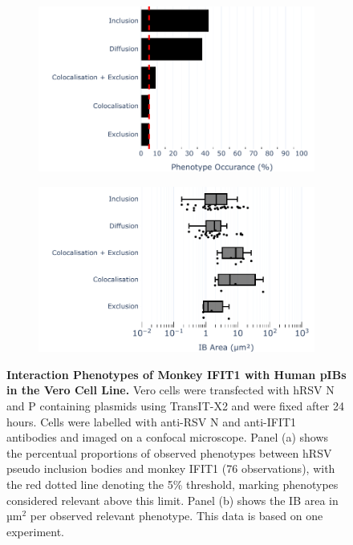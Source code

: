 \begin{figure}
    \begin{subfigure}{0.495\textwidth}
        \caption{}
        \includegraphics[width=1\linewidth]{09. Chapter 4/Figs/01. pIB/02. IFIT1/04. bar_i1_vero_hnhp.pdf} 
    \end{subfigure}
    \begin{subfigure}{0.495\textwidth}
        \caption{}
        \includegraphics[width=1\linewidth]{09. Chapter 4/Figs/01. pIB/02. IFIT1/05. box_i1_vero_hnhp.pdf}
    \end{subfigure}
    \caption[Interaction Phenotypes of Monkey IFIT1 with Human pIBs in the Vero Cell Line.]{\textbf{Interaction Phenotypes of Monkey IFIT1 with Human pIBs in the Vero Cell Line.} Vero cells were transfected with hRSV N and P containing plasmids using TransIT-X2 and were fixed after 24 hours. Cells were labelled with anti-RSV N and anti-IFIT1 antibodies and imaged on a confocal microscope. Panel (a) shows the percentual proportions of observed phenotypes between hRSV pseudo inclusion bodies and monkey IFIT1 (76 observations), with the red dotted line denoting the 5\% threshold, marking phenotypes considered relevant above this limit. Panel (b) shows the IB area in \(\mbox{µm}^2\) per observed relevant phenotype. This data is based on one experiment.}
    \label{fig:Interaction Phenotypes of Monkey IFIT1 with Human pIBs in the VERO Cell Line}
\end{figure}

